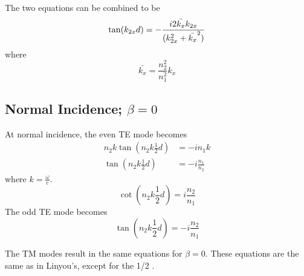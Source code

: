\documentclass[12pt]{article}
\numberwithin{equation}{section}
\begin{document}
The two equations can be combined to be
\begin{equation}
\tan (k_{2x} d )  = - \frac{ i 2 \bar{k_x} k_{2x}}{( k_{2x}^2 + \bar{k_x}^2 )} \\
\end{equation}
where 
\begin{equation}
\bar{k_x} = \frac{{n_2^2}}{n_1^2} k_x
\end{equation}

\subsection{Normal Incidence; $\beta = 0$}

At normal incidence, 
the even TE mode becomes
\begin{equation}
\begin{aligned}
n_2 k \tan (n_2 k \frac{1}{2} d ) & = - i n_1 k \\ 
\tan (n_2 k \frac{1}{2} d ) & = - i  \frac{n_1}{n_2}
\end{aligned}
\end{equation}
where $k = \frac{\omega}{c}$.
\begin{equation}
\boxed{\cot (n_2 k \frac{1}{2} d ) = i \frac{n_2}{n_1} }
\end{equation}
The odd TE mode becomes
\begin{equation}
\boxed{\tan (n_2 k \frac{1}{2} d ) = - i \frac{n_2}{n_1} }
\end{equation}

The TM modes result in the same equations for $\beta = 0$.  
These equations are the same as in Linyou's, except for the 1/2 \cite{Yu:12}.  



%
%
\end{document}

